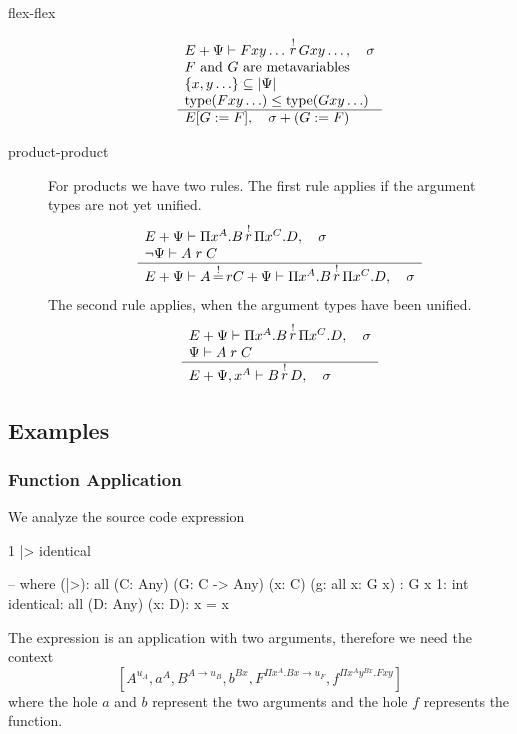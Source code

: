 \begin{description}
\item[flex-flex]

$$
\begin{array}{l} 
    E + \Psi \vdash F x y \ldots {\,\stackrel{!}{r}\,} G x y \ldots,
    \quad \sigma
    \\
    \text{$F$ and $G$ are metavariables}
    \\
    \{x, y \ldots\} \subseteq |\Psi|
    \\
    \text{type}(F x y \ldots) \le \text{type}(G x y \ldots)
 \\ \hline 
    E[G := F], \quad \sigma + (G := F)
\end{array}
$$





\item[product-product]

For products we have two rules. The first rule applies if the argument types are
not yet unified.
$$
\begin{array}{l} 
    E + \Psi \vdash \Pi x^A.B {\,\stackrel{!}{r}\,} \Pi x^C. D, \quad \sigma
    \\
    \lnot \Psi \vdash A \mathrel{r} C
 \\ \hline 
    E
    + \Psi \vdash A {\,\stackrel{!}{=}\,}{r} C
    + \Psi \vdash \Pi x^A.B {\,\stackrel{!}{r}\,} \Pi x^C. D,
    \quad \sigma
\end{array}
$$
%
The second rule applies, when the argument types have been unified.
$$
\begin{array}{l} 
    E + \Psi \vdash \Pi x^A.B {\,\stackrel{!}{r}\,} \Pi x^C. D, \quad \sigma
    \\
    \Psi \vdash A \mathrel{r} C
 \\ \hline 
    E
    + \Psi,x^A \vdash B {\,\stackrel{!}{r}\,} D
    ,\quad \sigma
\end{array}
$$


\end{description}



\subsection{Examples}


\subsubsection {Function Application}

We analyze the source code expression
\begin{alba}
    1 |> identical

    -- where
    (|>): all (C: Any) (G: C -> Any) (x: C) (g: all x: G x) : G x
    1: int
    identical: all (D: Any) (x: D): x = x
\end{alba}
%
The expression  is an application with two arguments,
therefore we need the context
$$
    [
        A^{u_A}, a^A,
        B^{A\to u_B}, b^{Bx},
        F^{\Pi x^A. B x \to u_F}, f^{\Pi x^A y^{Bx}. F x y}
    ]
$$
%
where the hole $a$ and $b$ represent the two arguments and the hole $f$
represents the function.



